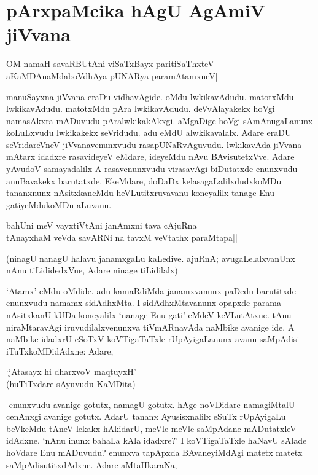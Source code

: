\chapter{pArxpaMcika hAgU AgAmiV jiVvana}

\begin{shloka}
OM namaH savaRBUtAni viSaTxBayx paritiSaThxteV|\\
aKaMDAnaMdaboVdhAya pUNARya paramAtamxneV||
\end{shloka}

manuSayxna jiVvana eraDu vidhavAgide. oMdu lwkikavAdudu. matotxMdu lwkikavAdudu. matotxMdu pAra lwkikavAdudu. deVvAlayakekx hoVgi namasAkxra mADuvudu pAralwkikakAkxgi. aMgaDige hoVgi sAmAnugaLanunx koLuLxvudu lwkikakekx seVridudu. adu eMdU alwkikavalalx. Adare eraDU seVridareVneV jiVvanavenunxvudu rasapUNaRvAguvudu. lwkikavAda jiVvana mAtarx idadxre rasavideyeV eMdare, ideyeMdu nAvu BAvisutetxVve. Adare yAvudoV samayadalilx A rasavenunxvudu virasavAgi biDutatxde enunxvudu anuBavakekx barutatxde. EkeMdare, doDaDx kelasagaLalilxdudxkoMDu tananxnunx nAsitxkaneMdu heVLutitxruvavanu koneyalilx tanage Enu gatiyeMdukoMDu aLuvanu.

\begin{shloka}
bahUni meV vayxtiVtAni janAmxni tava cAjuRna|\\
tAnayxhaM veVda savARNi na tavxM veVtathx paraMtapa||
\end{shloka} 

(ninagU nanagU halavu janamxgaLu kaLedive. ajuRnA; avugaLelalxvanUnx nAnu tiLididedxVne, Adare ninage tiLidilalx)

`Atamx' eMdu oMdide. adu kamaRdiMda janamxvanunx paDedu barutitxde enunxvudu namamx sidAdhxMta. I sidAdhxMtavanunx opapxde parama nAsitxkanU kUDa koneyalilx `nanage Enu gati' eMdeV keVLutAtxne. tAnu niraMtaravAgi iruvudilalxvenunxva tiVmARnavAda naMbike avanige ide. A naMbike idadxrU eSoTxV koVTigaTaTxle rUpAyigaLanunx avanu saMpAdisi iTuTxkoMDidAdxne: Adare,

\begin{shloka}
`jAtasayx hi dharxvoV maqtuyxH'\\
(huTiTxdare sAyuvudu KaMDita)
\end{shloka}

-enunxvudu avanige gotutx, namagU gotutx. hAge noVDidare namagiMtalU cenAnxgi avanige gotutx. AdarU tananx Ayusisxnalilx eSuTx rUpAyigaLu beVkeMdu tAneV lekakx hAkidarU, meVle meVle saMpAdane mADutatxleV idAdxne. `nAnu inunx bahaLa kAla idadxre?' I koVTigaTaTxle haNavU sAlade hoVdare Enu mADuvudu? enunxva tapApxda BAvaneyiMdAgi matetx matetx saMpAdisutitxdAdxne. Adare aMtaHkaraNa,

